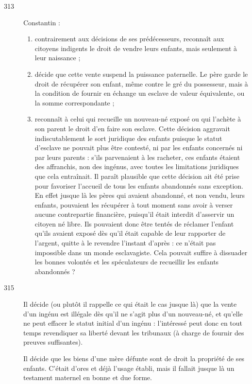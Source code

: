 \begin{description}
\item[313] Constantin :
 \begin{enumerate}[leftmargin=*,itemsep=0pt]
\item contrairement aux décisions de ses prédécesseurs, reconnaît aux citoyens indigents le droit de vendre leurs enfants, mais seulement à leur naissance ; 
\item décide que cette vente suspend la puissance paternelle. Le père garde le droit de récupérer son enfant, même contre le gré du possesseur, mais à la condition de fournir en échange un esclave de valeur équivalente, ou la somme correspondante ; 
\item reconnaît à celui qui recueille un nouveau-né exposé ou qui l'achète à son parent le droit d'en faire son esclave. Cette décision aggravait indiscutablement le sort juridique des enfants puisque le statut d'esclave ne pouvait plus être contesté, ni par les enfants concernés ni par leurs parents : s'ils parvenaient à les racheter, ces enfants étaient des affranchis, non des ingénus, avec toutes les limitations juridiques que cela entraînait. Il paraît plausible que cette décision ait été prise pour favoriser l'accueil de tous les enfants abandonnés sans exception. En effet jusque là les pères qui avaient abandonné, et non vendu, leurs enfants, pouvaient les récupérer à tout moment sans avoir à verser aucune contrepartie financière, puisqu'il était interdit d'asservir un citoyen né libre. Ils pouvaient donc être tentés de réclamer l'enfant qu'ils avaient exposé dès qu'il était capable de leur rapporter de l'argent, quitte à le revendre l'instant d'après : ce n'était pas impossible dans un monde esclavagiste. Cela pouvait suffire à dissuader les bonnes volontés et les spéculateurs de recueillir les enfants abandonnés ? 
\end{enumerate}
 
\item[315] Il décide (ou plutôt il rappelle ce qui était le cas jusque là) que la vente d'un ingénu est illégale dès qu'il ne s'agit plus d'un nouveau-né, et qu'elle ne peut effacer le statut initial d'un ingénu : l'intéressé peut donc en tout temps revendiquer sa liberté devant les tribunaux (à charge de fournir des preuves suffisantes).

Il décide que les biens d'une mère défunte sont de droit la propriété de ses enfants. C'était d'ores et déjà l'usage établi, mais il fallait jusque là un testament maternel en bonne et due forme.


\end{description}
